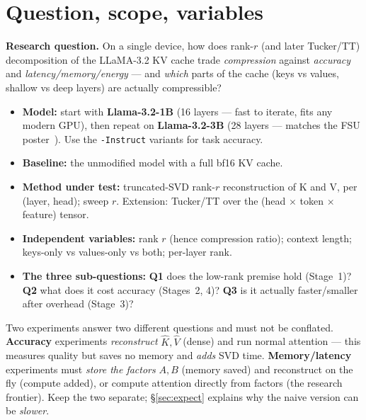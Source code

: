 \documentclass[11pt]{article}
\newcommand{\term}[1]{\textbf{\color{accent!85!black}#1}}
\newcommand{\code}[1]{\texttt{\small #1}}
\begin{document}
\section{Question, scope, variables}

\begin{goalbox}
\textbf{Research question.} On a single device, how does rank-$r$ (and later Tucker/TT)
decomposition of the LLaMA-3.2 KV cache trade \emph{compression} against \emph{accuracy} and
\emph{latency/memory/energy} --- and \emph{which} parts of the cache (keys vs values, shallow vs
deep layers) are actually compressible?
\end{goalbox}

\begin{itemize}[leftmargin=1.4em,itemsep=1pt]
\item \term{Model:} start with \textbf{Llama-3.2-1B} (16 layers --- fast to iterate, fits any
modern GPU), then repeat on \textbf{Llama-3.2-3B} (28 layers --- matches the FSU
poster~\cite{poster}). Use the \code{-Instruct} variants for task accuracy.
\item \term{Baseline:} the unmodified model with a full bf16 KV cache.
\item \term{Method under test:} truncated-SVD rank-$r$ reconstruction of K and V, per (layer, head);
sweep $r$. Extension: Tucker/TT over the (head $\times$ token $\times$ feature) tensor.
\item \term{Independent variables:} rank $r$ (hence compression ratio); context length;
keys-only vs values-only vs both; per-layer rank.
\item \term{The three sub-questions:} \textbf{Q1} does the low-rank premise hold (Stage~1)?
\textbf{Q2} what does it cost accuracy (Stages~2, 4)? \textbf{Q3} is it actually faster/smaller
after overhead (Stage~3)?
\end{itemize}

\begin{tipbox}
Two experiments answer two different questions and must not be conflated. \textbf{Accuracy}
experiments \emph{reconstruct} $\hat K,\hat V$ (dense) and run normal attention --- this measures
quality but saves no memory and \emph{adds} SVD time. \textbf{Memory/latency} experiments must
\emph{store the factors} $A,B$ (memory saved) and reconstruct on the fly (compute added), or
compute attention directly from factors (the research frontier). Keep the two separate; \S\ref{sec:expect}
explains why the naive version can be \emph{slower}.
\end{tipbox}
\end{document}
